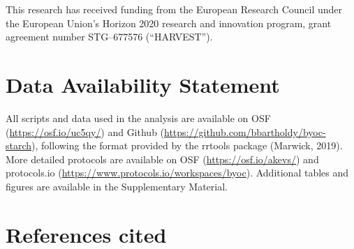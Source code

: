 \documentclass[
]{article}
\begin{document}
This research has received funding from the European Research Council under the
European Union's Horizon 2020 research and innovation program, grant agreement
number STG--677576 (``HARVEST'').

\hypertarget{data-availability-statement}{%
\section*{Data Availability Statement}\label{data-availability-statement}}

All scripts and data used in the analysis are available on OSF
(\url{https://osf.io/uc5qy/}) and Github (\url{https://github.com/bbartholdy/byoc-starch}),
following the format provided by the rrtools package (Marwick, 2019).
More detailed protocols are available on OSF (\url{https://osf.io/akevs/}) and protocols.io (\url{https://www.protocols.io/workspaces/byoc}).
Additional tables and figures are available in the Supplementary Material.

\hypertarget{references-cited}{%
\section*{References cited}\label{references-cited}}
\end{document}
